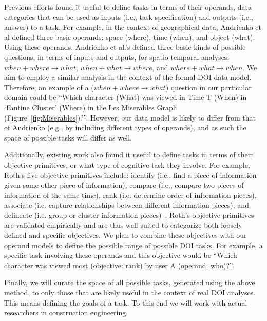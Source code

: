 Previous efforts found it useful to define tasks in terms of their operands, data categories that can be used as inputs (i.e., task specification) and outputs (i.e., answer) to a task.  For example, in the context of geographical data, Andrienko et al defined three basic operands: space (where), time (when), and object (what). Using these operands, Andrienko et al.'s defined three basic kinds of possible questions, in terms of inputs and outputs, for spatio-temporal analyses: $when + where \rightarrow what$, $when + what \rightarrow where$, and $where + what \rightarrow when$. We aim to employ a similar analysis in the context of the formal DOI data model. Therefore, an example of a ($when + where \rightarrow what$) question in our particular domain could be ``Which character (What) was viewed in Time T (When) in `Fantine Cluster' (Where) in the Les Miserables Graph (Figure~\ref{fig:Miserables})?''. However, our data model is likely to differ from that of Andrienko (e.g., by including different types of operands), and as such the space of possible tasks will differ as well. 

Additionally, existing work also found it useful to define tasks in terms of their objective primitives, or what type of cognitive task they involve. For example, Roth's five objective primitives include: identify (i.e., find a piece of information given some other piece of information), compare (i.e., compare two pieces of information of the same time), rank (i.e. determine order of information pieces), associate (i.e. capture relationships between different information pieces), and delineate (i.e. group or cluster information pieces)~\cite{Roth13}.  Roth's objective primitives are validated empirically and are thus well suited to categorize both loosely defined and specific objectives. We plan to combine these objectives with our operand models to define the possible range of possible DOI tasks. For example, a specific task involving these operands and this objective would be ``Which character was viewed most (objective: rank) by user A (operand: who)?''. 

Finally, we will curate the space of all possible tasks, generated using the above method, to only those that are likely useful in the context of real DOI analyses. This means defining the goals of a task. To this end we will work with actual researchers in construction engineering. 

